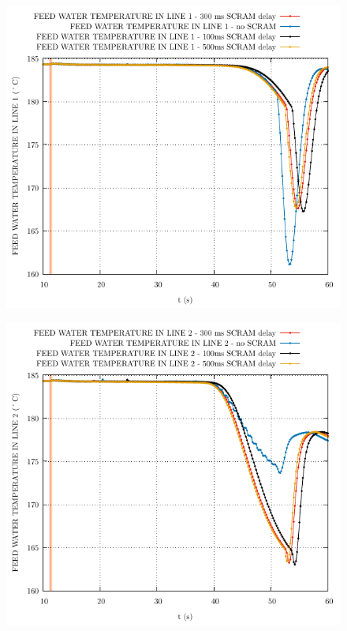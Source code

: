 \documentclass{article}
\begin{document}
\begin{multicols}{2}
\begin{figure}[H]
\end{figure}
\begin{figure}[H]
\centering
\includegraphics[width=\columnwidth]{./graphs/FEED WATER TEMPERATURE IN LINE 1_comp.pdf}
\end{figure}
\begin{figure}[H]
\centering
\includegraphics[width=\columnwidth]{./graphs/FEED WATER TEMPERATURE IN LINE 2_comp.pdf}

\end{figure}
\end{multicols}
\end{document}
